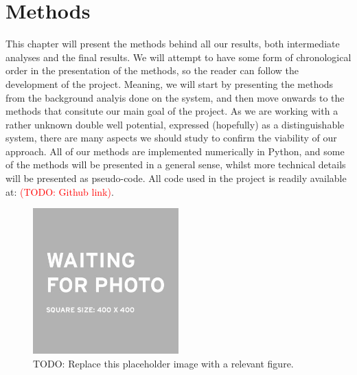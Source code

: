 \documentclass{subfiles}
\begin{document}
\chapter{Methods}
This chapter will present the methods behind all our results, both intermediate analyses and the final results. We will attempt to have some form of chronological order in the presentation of the methods, so the reader can follow the development of the project. Meaning, we will start by presenting the methods from the background analyis done on the system, and then move onwards to the methods that consitute our main goal of the project. As we are working with a rather unknown double well potential, expressed (hopefully) as a distinguishable system, there are many aspects we should study to confirm the viability of our approach. All of our methods are implemented numerically in Python, and some of the methods will be presented in a general sense, whilst more technical details will be presented as pseudo-code. All code used in the project is readily available at: \textcolor{red}{(TODO: Github link)}.
\begin{figure}
\centering
\includegraphics[width=0.5\textwidth]{figs/placeholder_image.jpeg}
\caption{TODO: Replace this placeholder image with a relevant figure. }
\label{fig:methods_intro}
\end{figure}
\newpage




\end{document}
